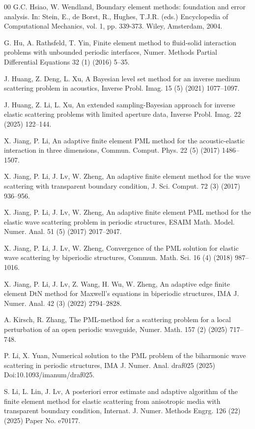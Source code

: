\documentclass[final,3p,times]{elsarticle}
\begin{document}
\begin{thebibliography}{00}
 G.C. Hsiao, W. Wendland, Boundary element methods: foundation and error analysis. In: Stein, E., de Borst, R., Hughes, T.J.R. (eds.) Encyclopedia of Computational Mechanics, vol. 1, pp. 339-373. Wiley, Amsterdam, 2004.

 G. Hu, A. Rathsfeld, T. Yin, Finite element method to fluid-solid interaction problems with unbounded periodic interfaces, Numer. Methods Partial Differential Equations 32 (1) (2016) 5--35.

  J. Huang, Z. Deng, L. Xu, A Bayesian level set method for an inverse medium scattering problem in acoustics, Inverse Probl. Imag. 15 (5)  (2021) 1077--1097.

 J. Huang, Z. Li, L. Xu, An extended sampling-Bayesian approach for inverse elastic scattering problems with limited aperture data, Inverse Probl. Imag. 22 (2025) 122--144.


 X. Jiang, P. Li, An adaptive finite element PML method for the acoustic-elastic interaction in three dimensions, Commun. Comput. Phys. 22 (5) (2017) 1486--1507.

 X. Jiang, P. Li, J. Lv, W. Zheng, An adaptive finite element method for the wave scattering with transparent boundary condition, J. Sci. Comput. 72 (3) (2017) 936--956.

 X. Jiang, P. Li, J. Lv, W. Zheng, An adaptive finite element PML method for the elastic wave scattering problem in periodic structures, ESAIM Math. Model. Numer. Anal. 51 (5) (2017) 2017--2047.

 X. Jiang, P. Li, J. Lv, W. Zheng, Convergence of the PML solution for elastic wave scattering by biperiodic structures, Commun. Math. Sci. 16 (4) (2018) 987--1016.

 X. Jiang, P. Li, J. Lv, Z. Wang, H. Wu, W. Zheng,  An adaptive edge finite element DtN method for Maxwell's equations in biperiodic structures, IMA J. Numer. Anal. 42 (3) (2022) 2794--2828.

 A. Kirsch, R. Zhang, The PML-method for a scattering problem for a local perturbation of an open periodic waveguide, Numer. Math. 157 (2) (2025) 717--748.

 P. Li, X. Yuan, Numerical solution to the PML problem of the biharmonic wave scattering in periodic structures, IMA J. Numer. Anal. draf025 (2025) Doi:10.1093/imanum/draf025.

 S. Li, L. Lin, J. Lv, A posteriori error estimate and adaptive algorithm of the finite element method for elastic scattering from anisotropic media with transparent boundary condition, Internat. J. Numer. Methods Engrg. 126 (22) (2025) Paper No. e70177.


\end{thebibliography}
\end{document}
